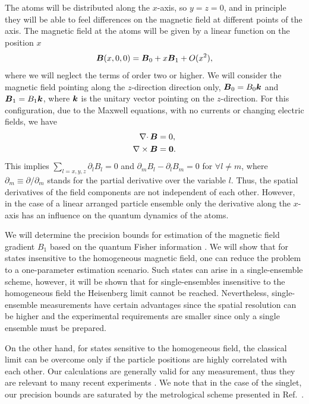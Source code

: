 The atoms will be distributed along the $x$-axis, so $y=z=0$, and in principle they will be able to feel differences on the magnetic field at different points of the axis.
The magnetic field at the atoms will be given by a linear function on the position $x$
\begin{equation}
\boldsymbol{B}(x,0,0)=\boldsymbol{B}_0 +x \boldsymbol{B}_1 + O(x^2),
\end{equation}
where we will neglect the terms of order two or higher.
We will consider the magnetic field pointing along the $z$-direction direction only, $\boldsymbol{B}_0=B_0 \boldsymbol{k}$ and $\boldsymbol{B}_1=B_1\boldsymbol{k}$, where $\boldsymbol{k}$ is the unitary vector pointing on the $z$-direction.
For this configuration, due to the Maxwell equations, with no currents or changing electric fields, we have
\begin{align}
\nabla \cdotp \boldsymbol{B}&=0, \nonumber \\
\nabla \times \boldsymbol{B}&=\boldsymbol{0}.
\end{align}
This implies $\sum_{l=x,y,z} \partial_l B_l=0$ and $ \partial_m B_l - \partial_l B_m =0$ for $\forall l\ne m$, where $\partial_m\equiv \partial/\partial_m$ stands for the partial derivative over the variable $l$.
Thus, the spatial derivatives of the field components are not independent of each other.
However, in the case of a linear arranged particle ensemble only the derivative along the $x$-axis has an influence on the quantum dynamics of the atoms.


We will determine the precision bounds for estimation of the magnetic field gradient $B_1$ based on the quantum Fisher information \cite{Paris2009,Braunstein1994,Holevo1982,Helstrom1976,Petz2002,Petz2008}.
We will show that for states insensitive to the homogeneous magnetic field, one can reduce the problem to a one-parameter estimation scenario.
Such states can arise in a single-ensemble scheme, however, it will be shown that for single-ensembles insensitive to the homogeneous field the Heisenberg limit cannot be reached.
Nevertheless, single-ensemble measurements have certain advantages since the spatial resolution can be higher and the experimental requirements are smaller since only a single ensemble must be prepared.

On the other hand, for states sensitive to the homogeneous field, the classical limit can be overcome only if the particle positions are highly correlated with each other.
Our calculations are generally valid for any measurement, thus they are relevant to many recent experiments \cite{Wasilewski2010,Eckert2006,Wildermuth2006, Wolfgramm2010,Koschorreck2011,Vengalattore2007,Zhou2010,Behbood2013}.
We note that in the case of the singlet, our precision bounds are saturated by the metrological scheme presented in Ref.~\cite{Urizar-Lanz2013}.

